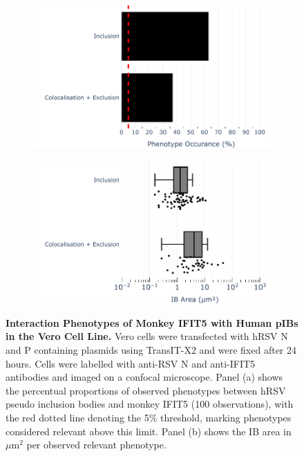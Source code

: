 \begin{figure}
    \begin{subfigure}{0.495\textwidth}
        \caption{}
        \includegraphics[width=1\linewidth]{09. Chapter 4/Figs/01. pIB/05. IFIT5/01. bar_i5_vero.pdf} 
    \end{subfigure}
    \begin{subfigure}{0.495\textwidth}
        \caption{}
        \includegraphics[width=1\linewidth]{09. Chapter 4/Figs/01. pIB/05. IFIT5/02. box_i5_vero.pdf}
    \end{subfigure}
    \caption[Interaction Phenotypes of Monkey IFIT5 with Human pIBs in the Vero Cell Line.]{\textbf{Interaction Phenotypes of Monkey IFIT5 with Human pIBs in the Vero Cell Line.} Vero cells were transfected with hRSV N and P containing plasmids using TransIT-X2 and were fixed after 24 hours. Cells were labelled with anti-RSV N and anti-IFIT5 antibodies and imaged on a confocal microscope. Panel (a) shows the percentual proportions of observed phenotypes between hRSV pseudo inclusion bodies and monkey IFIT5 (100 observations), with the red dotted line denoting the 5\% threshold, marking phenotypes considered relevant above this limit. Panel (b) shows the IB area in \(\mu \mbox{m}^2\) per observed relevant phenotype.}
    \label{fig:Interaction Phenotypes of Monkey IFIT5 with Human pIBs in the VERO Cell Line}
\end{figure}

